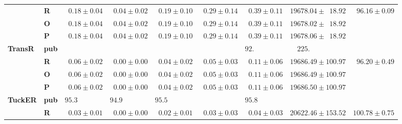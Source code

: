 \begin{tabular}{llrrrrrrr}
       & \textbf{R} &  $\phantom{0}0.18 \pm 0.04$ &  $\phantom{0}0.04 \pm 0.02$ &  $\phantom{0}0.19 \pm 0.10$ &  $\phantom{0}0.29 \pm 0.14$ &  $\phantom{0}0.39 \pm 0.11$ &            $19678.04 \pm \phantom{0}18.92$ &  $\phantom{0}96.16 \pm 0.09$ \\
       & \textbf{O} &  $\phantom{0}0.18 \pm 0.04$ &  $\phantom{0}0.04 \pm 0.02$ &  $\phantom{0}0.19 \pm 0.10$ &  $\phantom{0}0.29 \pm 0.14$ &  $\phantom{0}0.39 \pm 0.11$ &            $19678.02 \pm \phantom{0}18.92$ &                              \\
       & \textbf{P} &  $\phantom{0}0.18 \pm 0.04$ &  $\phantom{0}0.04 \pm 0.02$ &  $\phantom{0}0.19 \pm 0.10$ &  $\phantom{0}0.29 \pm 0.14$ &  $\phantom{0}0.39 \pm 0.11$ &            $19678.06 \pm \phantom{0}18.92$ &                              \\\midrule
\textbf{TransR} & \textbf{pub} &                             &                             &                             &                             &  $92.\phantom{00 \pm 0.00}$ &  $\phantom{00}225.\phantom{00 \pm 000.00}$ &                              \\
       & \textbf{R} &  $\phantom{0}0.06 \pm 0.02$ &  $\phantom{0}0.00 \pm 0.00$ &  $\phantom{0}0.04 \pm 0.02$ &  $\phantom{0}0.05 \pm 0.03$ &  $\phantom{0}0.11 \pm 0.06$ &                      $19686.49 \pm 100.97$ &  $\phantom{0}96.20 \pm 0.49$ \\
       & \textbf{O} &  $\phantom{0}0.06 \pm 0.02$ &  $\phantom{0}0.00 \pm 0.00$ &  $\phantom{0}0.04 \pm 0.02$ &  $\phantom{0}0.05 \pm 0.03$ &  $\phantom{0}0.11 \pm 0.06$ &                      $19686.49 \pm 100.97$ &                              \\
       & \textbf{P} &  $\phantom{0}0.06 \pm 0.02$ &  $\phantom{0}0.00 \pm 0.00$ &  $\phantom{0}0.04 \pm 0.02$ &  $\phantom{0}0.05 \pm 0.03$ &  $\phantom{0}0.11 \pm 0.06$ &                      $19686.50 \pm 100.97$ &                              \\\midrule
\textbf{TuckER} & \textbf{pub} &  $95.3\phantom{0 \pm 0.00}$ &  $94.9\phantom{0 \pm 0.00}$ &  $95.5\phantom{0 \pm 0.00}$ &                             &  $95.8\phantom{0 \pm 0.00}$ &                                            &                              \\
       & \textbf{R} &  $\phantom{0}0.03 \pm 0.01$ &  $\phantom{0}0.00 \pm 0.00$ &  $\phantom{0}0.02 \pm 0.01$ &  $\phantom{0}0.03 \pm 0.03$ &  $\phantom{0}0.04 \pm 0.03$ &                      $20622.46 \pm 153.52$ &            $100.78 \pm 0.75$ \\
\bottomrule
\end{tabular}

